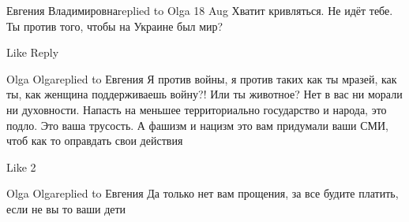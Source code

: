  
 
 
 
 


Евгения Владимировнаreplied to Olga
18 Aug
Хватит кривляться. Не идёт тебе. Ты против того, чтобы на Украине был мир?

    Like
    Reply

Olga Olgareplied to Евгения
Я против войны, я против таких как ты мразей, как ты, как женщина поддерживаешь войну?! Или ты животное? Нет в вас ни морали ни духовности. Напасть на меньшее территориально государство и народа, это подло. Это ваша трусость. А фашизм и нацизм это вам придумали ваши СМИ, чтоб как то оправдать свои действия

    Like 2

Olga Olgareplied to Евгения
Да только нет вам прощения, за все будите платить, если не вы то ваши дети
